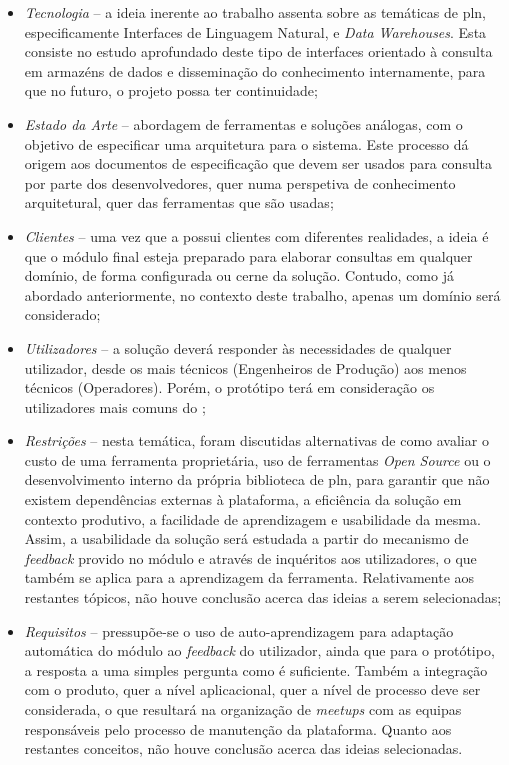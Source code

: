 \begin{itemize}
    \item
    {
        \textit{Tecnologia} -- a ideia inerente ao trabalho assenta sobre as temáticas de \gls{pln}, especificamente Interfaces de Linguagem Natural, e \textit{Data Warehouses}. Esta consiste no estudo aprofundado deste tipo de interfaces orientado à consulta em armazéns de dados e disseminação do conhecimento internamente, para que no futuro, o projeto possa ter continuidade;
    }
    \item
    {
        \textit{Estado da Arte} -- abordagem de ferramentas e soluções análogas, com o objetivo de especificar uma arquitetura para o sistema. Este processo dá origem aos documentos de especificação que devem ser usados para consulta por parte dos desenvolvedores, quer numa perspetiva de conhecimento arquitetural, quer das ferramentas que são usadas;
    }
    \item
    {
        \textit{Clientes} -- uma vez que a {\companyname} possui clientes com diferentes realidades, a ideia é que o módulo final esteja preparado para elaborar consultas em qualquer domínio, de forma configurada ou cerne da solução. Contudo, como já abordado anteriormente, no contexto deste trabalho, apenas um domínio será considerado;
    }
    \item
    {
        \textit{Utilizadores} -- a solução deverá responder às necessidades de qualquer utilizador, desde os mais técnicos (Engenheiros de Produção) aos menos técnicos (Operadores). Porém, o protótipo terá em consideração os utilizadores mais comuns do {\productname};
    }
    \item
    {
        \textit{Restrições} -- nesta temática, foram discutidas alternativas de como avaliar o custo de uma ferramenta proprietária, uso de ferramentas \textit{Open Source} ou o desenvolvimento interno da própria biblioteca de \gls{pln}, para garantir que não existem dependências externas à plataforma, a eficiência da solução em contexto produtivo, a facilidade de aprendizagem e usabilidade da mesma. Assim, a usabilidade da solução será estudada a partir do mecanismo de \textit{feedback} provido no módulo e através de inquéritos aos utilizadores, o que também se aplica para a aprendizagem da ferramenta. Relativamente aos restantes tópicos, não houve conclusão acerca das ideias a serem selecionadas;
    }
    \item
    {
        \textit{Requisitos} -- pressupõe-se o uso de auto-aprendizagem para adaptação automática do módulo ao \textit{feedback} do utilizador, ainda que para o protótipo, a resposta a uma simples pergunta como  é suficiente. Também a integração com o produto, quer a nível aplicacional, quer a nível de processo deve ser considerada, o que resultará na organização de \textit{meetups} com as equipas responsáveis pelo processo de manutenção da plataforma. Quanto aos restantes conceitos, não houve conclusão acerca das ideias selecionadas.
    }
\end{itemize}

